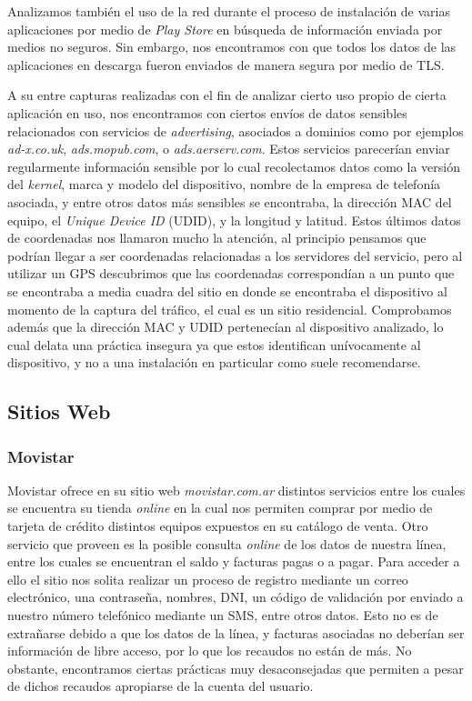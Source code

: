 \documentclass[10pt,a4paper]{article}
\begin{document}
Analizamos también el uso de la red durante el proceso de instalación de varias aplicaciones por medio de \textit{Play Store} en búsqueda de información enviada por medios no seguros. Sin embargo, nos encontramos con que todos los datos de las aplicaciones en descarga fueron enviados de manera segura por medio de TLS.

A su entre capturas realizadas con el fin de analizar cierto uso propio de cierta aplicación en uso, nos encontramos con ciertos envíos de datos sensibles relacionados con servicios de \textit{advertising}, asociados a dominios como por ejemplos \textit{ad-x.co.uk}, \textit{ads.mopub.com}, o \textit{ads.aerserv.com}. Estos servicios parecerían enviar regularmente información sensible por lo cual recolectamos datos como la versión del \textit{kernel}, marca y modelo del dispositivo, nombre de la empresa de telefonía asociada, y entre otros datos más sensibles se encontraba, la dirección MAC del equipo, el \textit{Unique Device ID} (UDID), y la longitud y latitud. Estos últimos datos de coordenadas nos llamaron mucho la atención, al principio pensamos que podrían llegar a ser coordenadas relacionadas a los servidores del servicio, pero al utilizar un GPS descubrimos que las coordenadas correspondían a un punto que se encontraba a media cuadra del sitio en donde se encontraba el dispositivo al momento de la captura del tráfico, el cual es un sitio residencial. Comprobamos además que la dirección MAC y UDID pertenecían al dispositivo analizado, lo cual delata una práctica insegura ya que estos identifican unívocamente al dispositivo, y no a una instalación en particular como suele recomendarse.



\subsection{Sitios Web}

\subsubsection{Movistar}

Movistar ofrece en su sitio web \textit{movistar.com.ar} distintos servicios entre los cuales se encuentra su tienda \textit{online} en la cual nos permiten comprar por medio de tarjeta de crédito distintos equipos expuestos en su catálogo de venta. Otro servicio que proveen es la posible consulta \textit{online} de los datos de nuestra línea, entre los cuales se encuentran el saldo y facturas pagas o a pagar. Para acceder a ello el sitio nos solita realizar un proceso de registro mediante un correo electrónico, una contraseña, nombres, DNI, un código de validación por enviado a nuestro número telefónico mediante un SMS, entre otros datos. Esto no es de extrañarse debido a que los datos de la línea, y facturas asociadas no deberían ser información de libre acceso, por lo que los recaudos no están de más. No obstante, encontramos ciertas prácticas muy desaconsejadas que permiten a pesar de dichos recaudos apropiarse de la cuenta del usuario.
\end{document}
